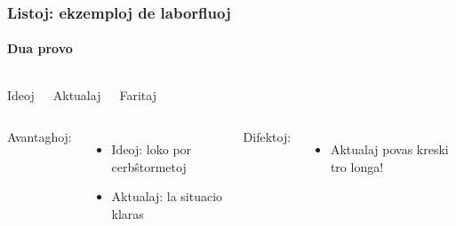   \begin{frame}
    \frametitle{Listoj: ekzemploj de laborfluoj}
    \framesubtitle{Dua provo}
    
    	\begin{columns}
	    \begin{block}
	    
	    	Ideoj
	    
    	\end{block}
    	\begin{block}
    	
    		Aktualaj
    	
    	\end{block}
    	\begin{block}
    	
    		Faritaj
    		
    	\end{block}
    	
	\end{columns}
    \vspace{4em}
    	\begin{columns}
    Avantaghoj:
    \begin{itemize}
    		\item Ideoj: loko por cerbŝtormetoj
    		\item Aktualaj: la situacio klaras
    \end{itemize}
	\column{0.5\textwidth}
    Difektoj:
    \begin{itemize}
    		\item Aktualaj povas kreski tro longa!
    \end{itemize}
    	
	\end{columns}
  \end{frame}


